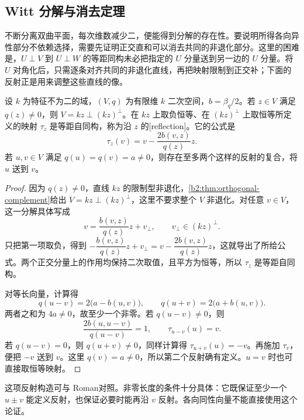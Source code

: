 \subsection{Witt 分解与消去定理}
\label{b2:subsec:1003:02}

不断分离双曲平面，每次维数减少二，便能得到分解的存在性。要说明所得各向异性部分不依赖选择，需要先证明正交直和可以消去共同的非退化部分。这里的困难是，\(U\perp V\) 到 \(U\perp W\) 的等距同构未必把指定的 \(U\) 分量送到另一边的 \(U\) 分量。将 \(U\) 对角化后，只需逐条对齐共同的非退化直线，再把映射限制到正交补；下面的反射正是用来调整这些直线的像。

\begin{lemma}[反射与等长向量]\label{b2:lem:orthogonal-reflection}
	设 \(k\) 为特征不为二的域，\((V,q)\) 为有限维 \(k\) 二次空间，\(b=\beta_q/2\)。若 \(z\in V\) 满足 \(q(z)\ne0\)，则 \(V=kz\perp(kz)^\perp\)。在 \(kz\) 上取负恒等、在 \((kz)^\perp\) 上取恒等所定义的映射 \(\tau_z\) 是等距自同构，称为沿 \(z\) 的[reflection]。它的公式是
	\[
		\tau_z(v)=v-\frac{2b(v,z)}{q(z)}z.
	\]
	若 \(u,v\in V\) 满足 \(q(u)=q(v)=a\ne0\)，则存在至多两个这样的反射的复合，将 \(u\) 送到 \(v\)。
\end{lemma}
\begin{proof}
	因为 \(q(z)\ne0\)，直线 \(kz\) 的限制型非退化，\cref{b2:thm:orthogonal-complement}给出 \(V=kz\perp(kz)^\perp\)，这里不要求整个 \(V\) 非退化。对任意 \(v\in V\)，这一分解具体写成
	\[
		v=\frac{b(v,z)}{q(z)}z+v_\perp, \qquad v_\perp\in(kz)^\perp.
	\]
	只把第一项取负，得到 \(-\dfrac{b(v,z)}{q(z)}z+v_\perp=v-\dfrac{2b(v,z)}{q(z)}z\)，这就导出了所给公式。两个正交分量上的作用均保持二次取值，且平方为恒等，所以 \(\tau_z\) 是等距自同构。

	对等长向量，计算得
	\[
		q(u-v)=2\bigl(a-b(u,v)\bigr),\qquad q(u+v)=2\bigl(a+b(u,v)\bigr).
	\]
	两者之和为 \(4a\ne0\)，故至少一个非零。若 \(q(u-v)\ne0\)，则
	\[
		\frac{2b(u,u-v)}{q(u-v)}=1, \qquad \tau_{u-v}(u)=v.
	\]
	若 \(q(u-v)=0\)，则 \(q(u+v)\ne0\)，同样计算得 \(\tau_{u+v}(u)=-v\)。再施加 \(\tau_v\)，便把 \(-v\) 送到 \(v\)。这里 \(q(v)=a\ne0\)，所以第二个反射确有定义。\(u=v\) 时也可直接取恒等映射。
\end{proof}

这项反射构造可与 Roman\cite[Chapter 11, Theorem 11.32]{Roman2008AdvancedLinearAlgebra}对照。非零长度的条件十分具体：它既保证至少一个 \(u\pm v\) 能定义反射，也保证必要时能再沿 \(v\) 反射。各向同性向量不能直接使用这个论证。

